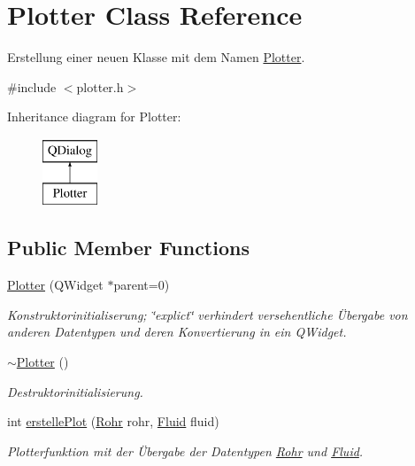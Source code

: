 \hypertarget{class_plotter}{}\section{Plotter Class Reference}
\label{class_plotter}


Erstellung einer neuen Klasse mit dem Namen \hyperlink{class_plotter}{Plotter}.  




{\ttfamily \#include $<$plotter.\+h$>$}

Inheritance diagram for Plotter\+:\begin{figure}[H]
\begin{center}
\leavevmode
\includegraphics[height=2.000000cm]{class_plotter}
\end{center}
\end{figure}
\subsection*{Public Member Functions}
\begin{DoxyCompactItemize}
\item 
\hyperlink{class_plotter_a367b6890c36910a27ec710ac3693e64b}{Plotter} (Q\+Widget $\ast$parent=0)
\begin{DoxyCompactList}\small\item\em Konstruktorinitialiserung; \char`\"{}explict\char`\"{} verhindert versehentliche Übergabe von anderen Datentypen und deren Konvertierung in ein Q\+Widget. \end{DoxyCompactList}\item 
\hyperlink{class_plotter_acd0883f9597a6b3bfcca0fce926809a0}{$\sim$\+Plotter} ()
\begin{DoxyCompactList}\small\item\em Destruktorinitialisierung. \end{DoxyCompactList}\item 
int \hyperlink{class_plotter_ad866f44f28b5bee3b528261560daee2f}{erstelle\+Plot} (\hyperlink{class_rohr}{Rohr} rohr, \hyperlink{class_fluid}{Fluid} fluid)
\begin{DoxyCompactList}\small\item\em Plotterfunktion mit der Übergabe der Datentypen \hyperlink{class_rohr}{Rohr} und \hyperlink{class_fluid}{Fluid}. \end{DoxyCompactList}\end{DoxyCompactItemize}


